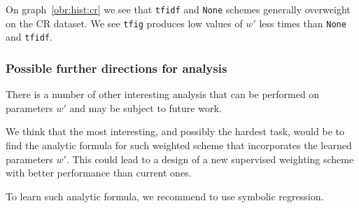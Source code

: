     On graph~\ref{obr:hist:cr} we see that \texttt{tfidf} and \texttt{None} schemes generally overweight on the CR dataset.
    We see \texttt{tfig} produces low values of $w'$ less times than \texttt{None} and \texttt{tfidf}.
    
    \subsubsection{Possible further directions for analysis}
    
    There is a number of other interesting analysis that can be performed on parameters $w'$ and may be subject to future work.
    
    We think that the most interesting, and possibly the hardest task, would be to find the analytic formula for such weighted scheme that incorporates the learned parameters $w'$. 
    This could lead to a design of a new supervised weighting scheme with better performance than current ones.
    
    To learn such analytic formula, we recommend to use symbolic regression.
